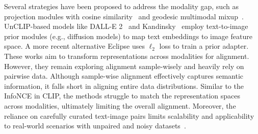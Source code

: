 Several strategies have been proposed to address the modality gap, such as
projection modules with cosine similarity~\cite{zhou2023clip, gao2024clip, huang2024llm2clip} and geodesic multimodal mixup~\cite{oh2024geodesic}. 
UnCLIP-based models like DALL-E 2~\citep{ramesh2022hierarchical} and Kandinsky~\citep{razzhigaev2023kandinsky} employ text-to-image prior modules (e.g., diffusion models) to map text embeddings to image feature space. 
A more recent alternative Eclipse \citep{patel2024eclipse} uses $\ell_2$ loss to train a prior adapter. 
These works aim to transform representations across modalities for alignment. 
However, they remain exploring alignment sample-wisely and heavily rely on pairwise data.
Although sample-wise alignment effectively captures semantic information, it falls short in aligning entire data distributions. 
Similar to the InfoNCE in CLIP, the methods struggle to match the representation spaces across modalities, ultimately limiting the overall alignment.
Moreover, the reliance on carefully curated text-image pairs limits scalability and applicability to real-world scenarios with unpaired and noisy datasets~\citep{lin2014microsoft,li2023leveraging}. 



